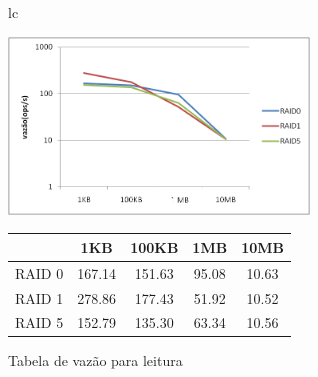 	\begin{figure}[h]
		\begin{tabular}{lc}
			\begin{minipage}{.50\textwidth}
				\begin{center}
					
					\includegraphics[clip,width=8.0cm]{images/resultados/throughput_leitura.png}
					\caption{Gráfico de vazão para leitura}
					\label{fig:throughput_l}
					
				\end{center}
				
			\end{minipage}
			
			\begin{minipage}{.5\textwidth}
				\makeatletter
				\def\@captype{table}
				\makeatother
				\caption{Tabela de vazão para leitura}
				\label{tab:throughput_l}
				\begin{center}
					\begin{tabular}{|c|c|c|c|c|} \hline
						& 1KB & 100KB & 1MB & 10MB \\ \hline
						
						RAID 0	& 167.14 & 151.63 & 95.08 & 10.63\\ \hline
						RAID 1	& 278.86 & 177.43 & 51.92 & 10.52\\ \hline
						RAID 5	& 152.79 & 135.30 & 63.34 & 10.56\\ \hline
						
					\end{tabular}
				\end{center}
				
			\end{minipage}
		\end{tabular}
	\end{figure}
	

